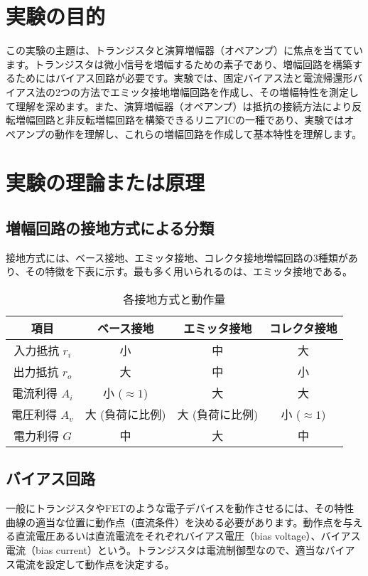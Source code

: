 \documentclass[a4paper,11pt,xelatex,ja=standard]{bxjsarticle}
\begin{document}
\section{実験の目的}
    この実験の主題は、トランジスタと演算増幅器（オペアンプ）に焦点を当てています。トランジスタは微小信号を増幅するための素子であり、増幅回路を構築するためにはバイアス回路が必要です。実験では、固定バイアス法と電流帰還形バイアス法の2つの方法でエミッタ接地増幅回路を作成し、その増幅特性を測定して理解を深めます。また、演算増幅器（オペアンプ）は抵抗の接続方法により反転増幅回路と非反転増幅回路を構築できるリニアICの一種であり、実験ではオペアンプの動作を理解し、これらの増幅回路を作成して基本特性を理解します。
\section{実験の理論または原理}
    \subsection{増幅回路の接地方式による分類}

    接地方式には、ベース接地、エミッタ接地、コレクタ接地増幅回路の3種類があり、その特徴を下表に示す。最も多く用いられるのは、エミッタ接地である。

    \begin{table}[H]
    \centering
    \begin{tabular}{|c|c|c|c|}
    \hline
    項目 & ベース接地 & エミッタ接地 & コレクタ接地 \\
    \hline
    入力抵抗 $r_i$ & 小 & 中 & 大 \\
    出力抵抗 $r_o$ & 大 & 中 & 小 \\
    電流利得 $A_i$ & 小 ($\approx 1$) & 大 & 大 \\
    電圧利得 $A_v$ & 大 (負荷に比例) & 大 (負荷に比例) & 小 ($\approx 1$) \\
    電力利得 $G$ & 中 & 大 & 中 \\
    \hline
    \end{tabular}
    \caption{各接地方式と動作量}
    \end{table}

    \subsection{バイアス回路}

    一般にトランジスタやFETのような電子デバイスを動作させるには、その特性曲線の適当な位置に動作点（直流条件）を決める必要があります。動作点を与える直流電圧あるいは直流電流をそれぞれバイアス電圧（bias voltage）、バイアス電流（bias current）という。トランジスタは電流制御型なので、適当なバイアス電流を設定して動作点を決定する。
\end{document}
